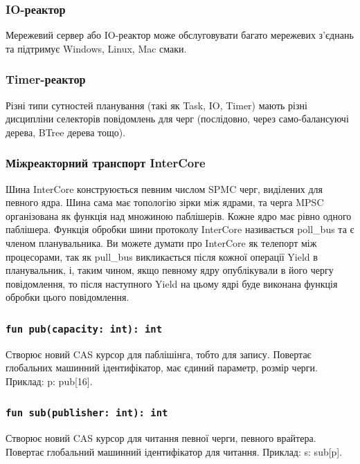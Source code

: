 \subsubsection*{IO-реактор}
Мережевий сервер або IO-реактор може обслуговувати багато
мережевих з'єднань та підтримує Windows, Linux, Mac смаки.

\subsubsection*{Timer-реактор}
Різні типи сутностей планування (такі як Task, IO, Timer)
мають різні дисципліни селекторів повідомлень для черг
(послідовно, через само-балансуючі дерева, BTree дерева тощо).

\subsubsection{Міжреакторний транспорт InterCore}
Шина InterCore конструюється певним числом SPMC черг, виділених для певного ядра.
Шина сама має топологію зірки між ядрами, та черга MPSC організована
як функція над множиною паблішерів. Кожне ядро має рівно одного паблішера.
Функція обробки шини протоколу InterCore називається poll\_bus та є членом планувальника.
Ви можете думати про InterCore як телепорт між процесорами, так як pull\_bus
викликається після кожної операції Yield в планувальник, і, таким чином,
якщо певному ядру опублікували в його чергу повідомлення, то після наступного Yield
на цьому ядрі буде виконана функція обробки цього повідомлення.

\subsubsection*{\lstinline{fun pub(capacity: int): int}}
Створює новий CAS курсор для паблішінга, тобто для запису.
Повертає глобальних машинний ідентифікатор, має єдиний параметр, розмір черги.
Приклад: p: pub[16].

\subsubsection*{\lstinline{fun sub(publisher: int): int}}
Створює новий CAS курсор для читання певної черги, певного врайтера.
Повертає глобальний машинний ідентифікатор для читання.
Приклад: s: sub[p].

